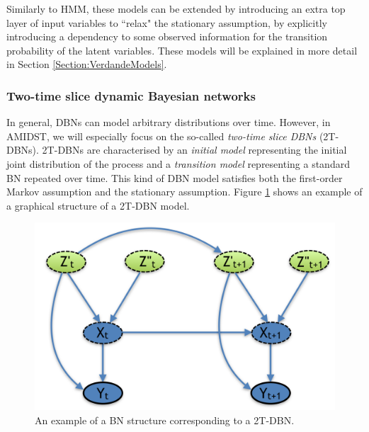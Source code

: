 Similarly to HMM, these models can be extended by introducing an extra top layer of input variables to ``relax" the stationary assumption, by explicitly introducing a dependency to some observed information for the transition probability of the latent variables. These models will be explained in more detail in Section \ref{Section:VerdandeModels}.

\subsubsection{Two-time slice dynamic Bayesian networks}\label{SubSubSection:2DBNs}	

In general, DBNs can model arbitrary distributions over time. However, in AMIDST,  we will especially focus on the so-called \textit{two-time slice DBNs} (2T-DBNs). 2T-DBNs are characterised by an \textit{initial model} representing the initial joint distribution of the process and a \textit{transition model} representing a standard BN repeated over time. This kind of DBN model satisfies both the first-order Markov assumption and the stationary assumption. Figure \ref{Figure:DBN} shows an example of a graphical structure of a 2T-DBN model. 

\begin{figure}[ht!]
\begin{center}
\includegraphics[scale=0.3]{./figures/PreliminariesDBN}
\caption{\label{Figure:DBN}An example of a BN structure corresponding to a 2T-DBN.}
\end{center}
\end{figure}

